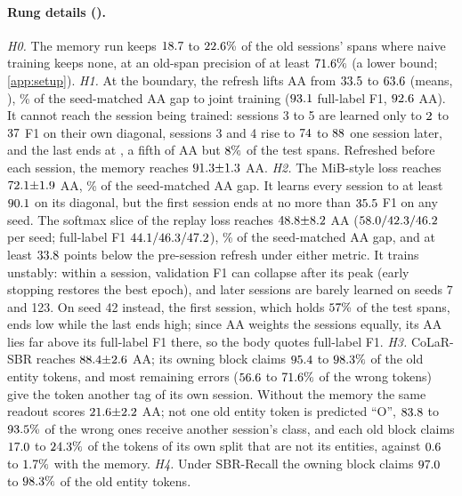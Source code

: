\paragraph{Rung details ().} \emph{H0.} The memory run keeps $18.7$ to $22.6\%$ of the old sessions' spans where naive training keeps none, at an old-span precision of at least $71.6\%$ (a lower bound; \cref{app:setup}). \emph{H1.} At the boundary, the refresh lifts AA from $33.5$ to $63.6$ (means, \nOracleScope), \nOracleShare\% of the seed-matched AA gap to joint training ($93.1$ full-label F1, $92.6$ AA). It cannot reach the session being trained: sessions 3 to 5 are learned only to $2$ to $37$ F1 on their own diagonal, sessions 3 and 4 rise to $74$ to $88$ one session later, and the last ends at \nOracleLast, a fifth of AA but $8\%$ of the test spans. Refreshed before each session, the memory reaches $91.3{\pm}1.3$ AA. \emph{H2.} The MiB-style loss reaches $72.1{\pm}1.9$ AA, \nMibShare\% of the seed-matched AA gap. It learns every session to at least $90.1$ on its diagonal, but the first session ends at no more than $35.5$ F1 on any seed. The softmax slice of the replay loss reaches $48.8{\pm}8.2$ AA ($58.0/42.3/46.2$ per seed; full-label F1 $44.1/46.3/47.2$), \nSlicedShare\% of the seed-matched AA gap, and at least $33.8$ points below the pre-session refresh under either metric. It trains unstably: within a session, validation F1 can collapse after its peak (early stopping restores the best epoch), and later sessions are barely learned on seeds 7 and 123. On seed 42 instead, the first session, which holds $57\%$ of the test spans, ends low while the last ends high; since AA weights the sessions equally, its AA lies far above its full-label F1 there, so the body quotes full-label F1. \emph{H3.} CoLaR-SBR reaches $88.4{\pm}2.6$ AA; its owning block claims $95.4$ to $98.3\%$ of the old entity tokens, and most remaining errors ($56.6$ to $71.6\%$ of the wrong tokens) give the token another tag of its own session. Without the memory the same readout scores $21.6{\pm}2.2$ AA; not one old entity token is predicted ``O'', $83.8$ to $93.5\%$ of the wrong ones receive another session's class, and each old block claims $17.0$ to $24.3\%$ of the tokens of its own split that are not its entities, against $0.6$ to $1.7\%$ with the memory. \emph{H4.} Under SBR-Recall the owning block claims $97.0$ to $98.3\%$ of the old entity tokens.

